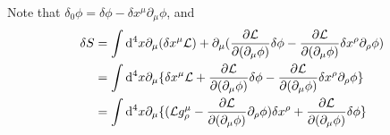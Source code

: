 \documentclass{article}
\newcommand{\id}{\int\dd^4x}
\newcommand{\lag}{\mathcal{L}}
\begin{document}
Note that $\delta_0 \phi=\delta \phi-\delta x^{\mu}\partial_{\mu}\phi$, and
\begin{align*}
  \delta S&=\id \partial_{\mu}(\delta x^{\mu}\lag)+\partial_{\mu}(\pdv{\lag}{(\partial_{\mu}\phi)}\delta \phi-\pdv{\lag}{(\partial_{\mu}\phi)}\delta x^{\rho}\partial_{\rho}\phi)\\
  &=\id \partial_{\mu}\{\delta x^{\mu}\lag+\pdv{\lag}{(\partial_{\mu}\phi)}\delta \phi-\pdv{\lag}{(\partial_{\mu}\phi)}\delta x^{\rho}\partial_{\rho}\phi\}\\
  &=\id \partial_{\mu}\{(\lag g^{\mu}_{\rho}-\pdv{\lag}{(\partial_{\mu}\phi)}\partial_{\rho}\phi)\delta x^{\rho}+\pdv{\lag}{(\partial_{\mu}\phi)}\delta \phi\}
\end{align*}
\end{document}
